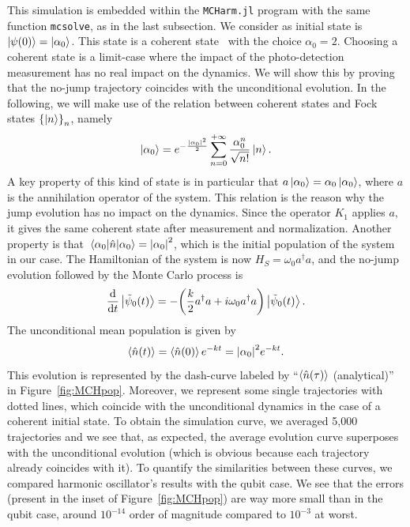 This simulation is embedded within the \verb|MCHarm.jl| program with the same function \verb|mcsolve|, as in the last subsection. We consider as  initial state is $\ket{\psi(0)}=\ket{\alpha_0}$. This state is a coherent state~\cite{Barnett} with the choice $\alpha_0=2$. Choosing a coherent state is a limit-case where the impact of the photo-detection measurement has no real impact on the dynamics. We will show this by proving that the no-jump trajectory coincides with the unconditional evolution. In the following, we will make use of the relation between coherent states and Fock states $\qty{\ket{n}}_n$, namely
\begin{equation}\label{eq:coherentfock}
    \ket{\alpha_0} = e^{-\frac{\abs{\alpha_0}^2}{2}}\sum_{n=0}^{+\infty} \frac{\alpha_0^n}{\sqrt{n!}}\ket{n}.
\end{equation}
A key property of this kind of state is in particular that $a\ket{\alpha_0}=\alpha_0\ket{\alpha_0}$, where $a$ is the annihilation operator of the system. This relation is the reason why the jump evolution has no impact on the dynamics. Since the operator $K_1$ applies $a$, it gives the same coherent state after measurement and normalization. Another property is that $\expval{\hat{n}}{\alpha_0} = \abs{\alpha_0}^2$, which is the initial population of the system in our case. The Hamiltonian of the system is now $H_S = \omega_0 a^\dagger a$, and the no-jump evolution followed by the Monte Carlo process is
\begin{equation}\label{eq:MCharmUNITS}
    \frac{\mathrm{d}}{\mathrm{d}t}\ket{\tilde{\psi}_0(t)} = -\qty(\frac{k}{2}a^\dagger a + i\omega_0 a^\dagger a) \ket{\tilde{\psi}_0(t)}.
\end{equation}
The unconditional mean population is given by 
\begin{equation}\label{eq:uncondMCH}
    \expval{\hat{n}(t)}=\expval{\hat{n}(0)}e^{-k t} = \abs{\alpha_0}^2 e^{-k t}.
\end{equation}
This evolution is represented by the dash-curve labeled by ``$\expval{\hat{n}(\tau)}$ (analytical)'' in Figure~\ref{fig:MCHpop}. Moreover, we represent some single trajectories with dotted lines, which coincide with the unconditional dynamics in the case of a coherent initial state. To obtain the simulation curve, we averaged 5,000 trajectories and we see that, as expected, the average evolution curve superposes with the unconditional evolution (which is obvious because each trajectory already coincides with it). To quantify the similarities between these curves, we compared harmonic oscillator's results with the qubit case. We see that the errors (present in the inset of Figure~\ref{fig:MCHpop}) are way more small than in the qubit case, around $10^{-14}$ order of magnitude compared to $10^{-3}$ at worst.

